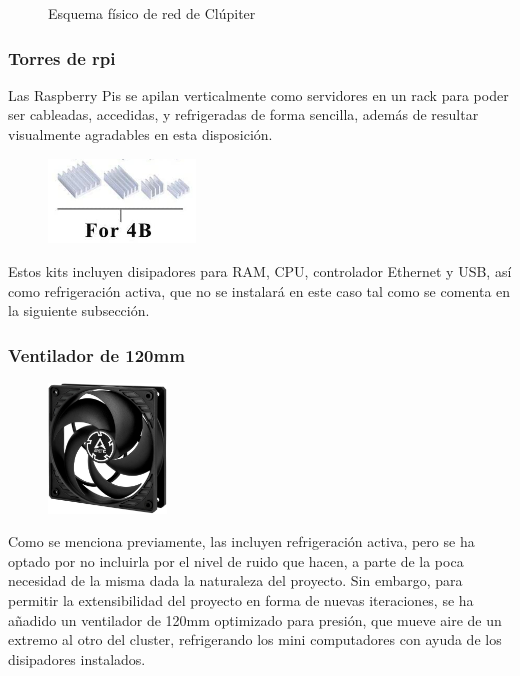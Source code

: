\begin{figure}[H]
  \centering
  \vspace*{0.5cm}
  \def\svgwidth{0.8\textwidth}
  
  \caption{Esquema físico de red de Clúpiter}
  \label{fig:raspi_diagram_eth}
\end{figure}

\subsubsection{Torres de \acrshort{rpi}}
\label{sssec:torresrpi}
Las Raspberry Pis se apilan verticalmente como servidores en un rack para poder ser cableadas, accedidas, y refrigeradas de forma sencilla, además de resultar visualmente agradables en esta disposición.

\begin{figure}
  \vspace*{-0.3cm}
  \centering
  \includegraphics[width=0.35\textwidth]{img/disipadores-rpi-4b.png}
  \label{fig:rpi4b-disipadores}
\end{figure}
Estos kits incluyen disipadores para RAM, CPU, controlador Ethernet y USB, así como refrigeración activa, que no se instalará en este caso tal como se comenta en la siguiente subsección.




\subsubsection{Ventilador de 120mm}
\begin{figure}
  \centering
  \includegraphics[width=0.28\textwidth]{img/arctic-fan.jpg}
  \label{fig:arctic-fan}
\end{figure}
Como se menciona previamente, las  incluyen refrigeración activa, pero se ha optado por no incluirla por el nivel de ruido que hacen, a parte de la poca necesidad de la misma dada la naturaleza del proyecto. Sin embargo, para permitir la extensibilidad del proyecto en forma de nuevas iteraciones, se ha añadido un ventilador de 120mm optimizado para presión, que mueve aire de un extremo al otro del cluster, refrigerando los mini computadores con ayuda de los disipadores instalados.


